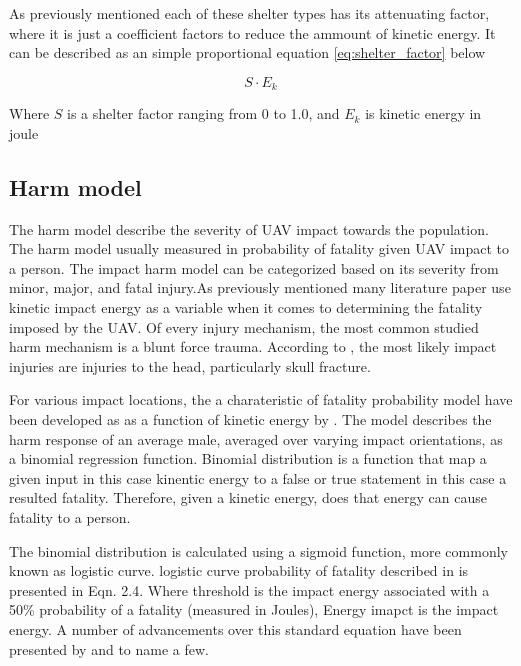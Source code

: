 \documentclass[12pt]{report}
\begin{document}
            As previously mentioned each of these shelter types has its attenuating factor, where it is just a
            coefficient factors to reduce the ammount of kinetic energy. It can be described as an simple proportional
            equation \ref{eq:shelter_factor} below

            \begin{equation}\label{eq:shelter_factor}
                S \cdot E_k
            \end{equation}

            Where \(S\) is a shelter factor ranging from 0 to 1.0, and \(E_k\) is kinetic energy in joule
            
        \subsection{Harm model}
            The harm model describe the severity of UAV impact towards the population. The harm model usually measured
            in probability of fatality given UAV impact to a person. The impact harm model can be categorized based on
            its severity from minor, major, and fatal injury.As previously mentioned many literature paper use kinetic
            impact energy as a variable when it comes to determining the fatality imposed by the UAV.  Of every injury
            mechanism, the most common studied harm mechanism is a blunt force trauma. According to
            \cite{shelley_model_2016}, the most likely impact injuries are injuries to the head, particularly skull
            fracture. 

            For various impact locations, the a charateristic of fatality probability model have been developed as as a
            function of kinetic energy by \cite{harwick_approved_2007}. The model describes the harm response of an
            average male, averaged over varying impact orientations, as a binomial regression function. Binomial
            distribution is a function that map a given input in this case kinentic energy to a false or true statement
            in this case a resulted fatality. Therefore, given a kinetic energy, does that energy can cause fatality to
            a person. 
            
            The binomial distribution is calculated using a sigmoid function, more commonly known as logistic curve.
            logistic curve probability of fatality described in \cite{shelley_model_2016} is presented in Eqn. 2.4.
            Where threshold is the impact energy associated with a 50\% probability of a fatality (measured in Joules),
            Energy imapct is the impact energy. A number of advancements over this standard equation have been presented
            by \cite{dalamagkidis_evaluating_2008} and \cite{shelley_model_2016} to name a few.
\end{document}
